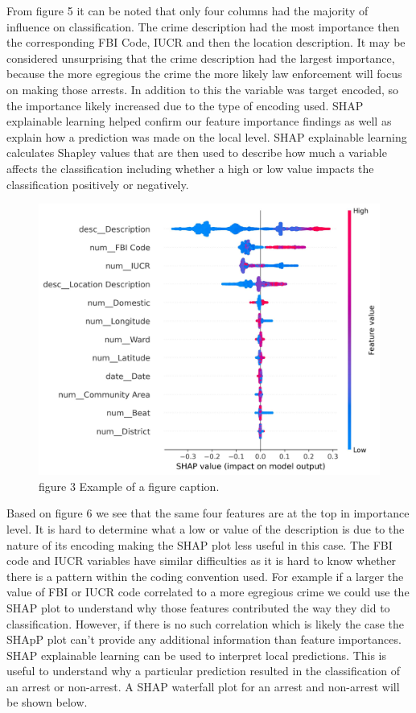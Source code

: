 \documentclass[conference]{IEEEtran}
\begin{document}
From figure 5 it can be noted that only four columns had the majority of influence on classification. The crime description had the most importance then the corresponding FBI Code,  IUCR and then the location description. It may be considered unsurprising that the crime description had the largest importance, because the more egregious the crime the more likely law enforcement will focus on making those arrests. In addition to this the variable was target encoded, so the importance likely increased due to the type of encoding used.
SHAP explainable learning helped confirm our feature importance findings as well as explain how a prediction was made on the local level. SHAP explainable learning calculates Shapley values that are then used to describe how much a variable affects the classification including whether a high or low value impacts the classification positively or negatively.
\begin{figure}[htbp]
\centerline{\includegraphics{Graphs/imbalanced_shap_impact.jpg}}
\caption{figure 3 Example of a figure caption.}
\label{imbalanced_shap_impact}
\end{figure}
Based on figure 6 we see that the same four features are at the top in importance level. It is hard to determine what a low or value of the description is due to the nature of its encoding making the SHAP plot less useful in this case. The FBI code and IUCR variables have similar difficulties as it is hard to know whether there is a pattern within the coding convention used. For example if a larger the value of FBI or IUCR code correlated to a more egregious crime we could use the SHAP plot to understand why those features contributed the way they did to classification. However, if there is no such correlation which is likely the case the SHApP plot can’t provide any additional information than feature importances.
SHAP explainable learning can be used to interpret local predictions. This is useful to understand why a particular prediction resulted in the classification of an arrest or non-arrest. A SHAP waterfall plot for an arrest and non-arrest will be shown below. 
\end{document}
